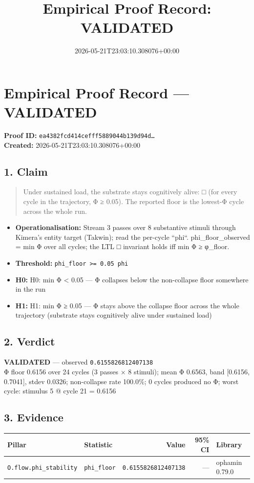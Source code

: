 \documentclass{article}
\title{Empirical Proof Record: VALIDATED}
\date{2026-05-21T23:03:10.308076+00:00}
\begin{document}
\maketitle
\section*{Empirical Proof Record --- \textcolor{validated}{\textbf{VALIDATED}}}
\textbf{Proof ID:} \texttt{ea4382fcd414cefff5889044b139d94d\dots}\\
\textbf{Created:} 2026-05-21T23:03:10.308076+00:00
\subsection*{1. Claim}
\begin{quote}Under sustained load, the substrate stays cognitively alive: □ (for every cycle in the trajectory, Φ ≥ 0.05). The reported floor is the lowest-Φ cycle across the whole run.\end{quote}
\begin{itemize}
\item \textbf{Operationalisation:} Stream 3 passes over 8 substantive stimuli through Kimera's entity target (Takwin); read the per-cycle ``phi``. phi\_floor\_observed = min Φ over all cycles; the LTL □ invariant holds iff min Φ ≥ φ\_floor.
\item \textbf{Threshold:} \texttt{phi\_floor >= 0.05 phi}
\item \textbf{H0:} H0: min Φ < 0.05 — Φ collapses below the non-collapse floor somewhere in the run
\item \textbf{H1:} H1: min Φ ≥ 0.05 — Φ stays above the collapse floor across the whole trajectory (substrate stays cognitively alive under sustained load)
\end{itemize}
\subsection*{2. Verdict}
\textcolor{validated}{\textbf{VALIDATED}} --- observed \texttt{0.6155826812407138}\\
Φ floor 0.6156 over 24 cycles (3 passes × 8 stimuli); mean Φ 0.6563, band [0.6156, 0.7041], stdev 0.0326; non-collapse rate 100.0\%; 0 cycles produced no Φ; worst cycle: stimulus 5 @ cycle 21 = 0.6156
\subsection*{3. Evidence}
\begin{tabular}{llrrl}\toprule
\textbf{Pillar} & \textbf{Statistic} & \textbf{Value} & \textbf{95\% CI} & \textbf{Library} \\\midrule
\texttt{O.flow.phi\_stability} & \texttt{phi\_floor} & \texttt{0.6155826812407138} & --- & ophamin 0.79.0 \\
\bottomrule\end{tabular}
\end{document}
